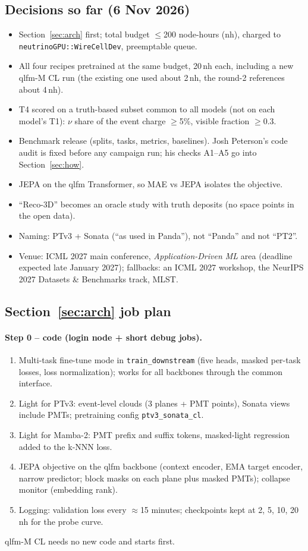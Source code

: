 \documentclass[11pt,a4paper]{article}
\newcommand{\code}[1]{\texttt{\small #1}}
\begin{document}
\subsection{Decisions so far (6 Nov 2026)}
\begin{itemize}
  \item Section~\ref{sec:arch} first; total budget $\leq$200 node-hours (nh), charged to \code{neutrinoGPU::WireCellDev}, preemptable queue.
  \item All four recipes pretrained at the same budget, 20\,nh each, including a new qlfm-M CL run (the existing one used about 2\,nh, the round-2 references about 4\,nh).
  \item T4 scored on a truth-based subset common to all models (not on each model's T1): $\nu$ share of the event charge $\geq$5\%, visible fraction $\geq$0.3.
  \item Benchmark release (splits, tasks, metrics, baselines). Josh Peterson's code audit is fixed before any campaign run; his checks A1--A5 go into Section~\ref{sec:how}.
  \item JEPA on the qlfm Transformer, so MAE vs JEPA isolates the objective.
  \item ``Reco-3D'' becomes an oracle study with truth deposits (no space points in the open data).
  \item Naming: PTv3 + Sonata (``as used in Panda''), not ``Panda'' and not ``PT2''.
  \item Venue: ICML 2027 main conference, \emph{Application-Driven ML} area (deadline expected late January 2027); fallbacks: an ICML 2027 workshop, the NeurIPS 2027 Datasets \& Benchmarks track, MLST.
\end{itemize}

\subsection{Section~\ref{sec:arch} job plan}
\paragraph{Step 0 -- code (login node + short debug jobs).}
\begin{enumerate}
  \item Multi-task fine-tune mode in \code{train\_downstream} (five heads, masked per-task losses, loss normalization); works for all backbones through the common interface.
  \item Light for PTv3: event-level clouds (3 planes + PMT points), Sonata views include PMTs; pretraining config \code{ptv3\_sonata\_cl}.
  \item Light for Mamba-2: PMT prefix and suffix tokens, masked-light regression added to the k-NNN loss.
  \item JEPA objective on the qlfm backbone (context encoder, EMA target encoder, narrow predictor; block masks on each plane plus masked PMTs); collapse monitor (embedding rank).
  \item Logging: validation loss every $\approx$15 minutes; checkpoints kept at 2, 5, 10, 20\,nh for the probe curve.
\end{enumerate}
qlfm-M CL needs no new code and starts first.
\end{document}
